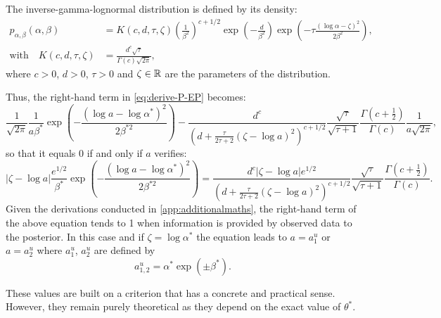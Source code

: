     The inverse-gamma-lognormal distribution is defined by its density:
    \begin{align}
        p_{\alpha,\beta}(\alpha,\beta) &= K(c,d,\tau,\zeta)\left(\frac{1}{\beta^2}\right)^{c+1/2}\exp\left(-\frac{d}{\beta^2}\right)\exp\left(-\tau\frac{(\log\alpha-\zeta)^2}{2\beta^2}\right),\nonumber\\
        \text{with}\quad K(c,d,\tau,\zeta) &=\frac{d^c\sqrt{\tau}}{\Gamma(c)\sqrt{2\pi}},
    \end{align}
    where $c>0$, $d>0$, $\tau>0$ and $\zeta\in\mathbb{R}$ are the parameters of the distribution. %
    
    Thus, the right-hand term in  \cref{eq:derive-P-EP} becomes:
    \begin{equation}
        \frac{1}{\sqrt{2\pi}}\frac{1}{a\beta^\ast}\exp\left(-\frac{(\log a-\log\alpha^\ast)^2}{2\beta^{\ast2}}\right) - \frac{d^c}{(d+\frac{\tau}{2\tau+2}(\zeta-\log a)^2)^{c+1/2}}\frac{\sqrt{\tau}}{\sqrt{\tau+1}}\frac{\Gamma(c+\frac{1}{2})}{\Gamma(c)}\frac{1}{a\sqrt{2\pi}},
    \end{equation}
    so that it equals $0$ if and only if $a$ verifies:
    \begin{equation}\label{eq:equality-au}
        |\zeta-\log a|\frac{e^{1/2}}{\beta^\ast}\exp\left(-\frac{(\log a-\log\alpha^\ast)^2}{2\beta^{\ast2}}\right) = \frac{d^c|\zeta-\log a|e^{1/2} }{(d+\frac{\tau}{2\tau+2}(\zeta-\log a)^2)^{c+1/2}}\frac{\sqrt{\tau}}{\sqrt{\tau+1}}\frac{\Gamma(c+\frac{1}{2})}{\Gamma(c)}.
    \end{equation}
    Given the derivations conducted in \cref{app:additionalmaths}, the right-hand term of the above equation tends to 1 when information is provided by observed data to the posterior. In this case and if $\zeta=\log\alpha^\ast$  the equation leads to $a=a^u_1$ or $a=a^u_2$ where $a^u_1$, $a^u_2$ are defined by
        \begin{equation}
            a^u_{1,2} = \alpha^\ast\exp\left(\pm\beta^\ast\right).
        \end{equation}
    
    These values are built on a criterion that has a concrete and practical sense. However, they remain purely theoretical as they depend on the exact value of $\theta^\ast$.
    
